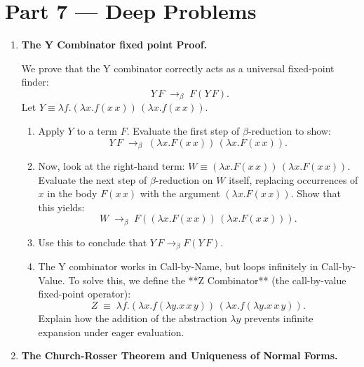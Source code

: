 \documentclass[12pt, a4paper]{book}
\begin{document}
\newpage

\section{Part 7 --- Deep Problems}

\begin{deepbox}
\begin{enumerate}[label=\textbf{D\arabic*.}]
  \item \textbf{The Y Combinator fixed point Proof.}
  
        We prove that the Y combinator correctly acts as a universal fixed-point finder:
        \[
          Y \, F \;\to_\beta\; F (Y \, F).
        \]
        Let $Y \equiv \lambda f. (\lambda x. f (x \, x)) \, (\lambda x. f (x \, x))$.
        
        \begin{enumerate}[label=(\alph*)]
          \item Apply $Y$ to a term $F$. Evaluate the first step of $\beta$-reduction to show:
                \[
                  Y \, F \;\to_\beta\; (\lambda x. F (x \, x)) \, (\lambda x. F (x \, x)).
                \]
          \item Now, look at the right-hand term: $W \equiv (\lambda x. F (x \, x)) \, (\lambda x. F (x \, x))$.
                Evaluate the next step of $\beta$-reduction on $W$ itself, replacing occurrences of $x$ in the body $F(x\,x)$ with the argument $(\lambda x. F (x \, x))$.
                Show that this yields:
                \[
                  W \;\to_\beta\; F \left( (\lambda x. F (x \, x)) \, (\lambda x. F (x \, x)) \right).
                \]
          \item Use this to conclude that $Y \, F \to_\beta F (Y \, F)$.
          \item The Y combinator works in Call-by-Name, but loops infinitely in Call-by-Value.
                To solve this, we define the **Z Combinator** (the call-by-value fixed-point operator):
                \[
                  Z \;\equiv\; \lambda f. (\lambda x. f (\lambda y. x \, x \, y)) \, (\lambda x. f (\lambda y. x \, x \, y)).
                \]
                Explain how the addition of the abstraction $\lambda y$ prevents infinite expansion under eager evaluation.
        \end{enumerate}

  \item \textbf{The Church-Rosser Theorem and Uniqueness of Normal Forms.}
  

\end{enumerate}
\end{deepbox}
\end{document}
